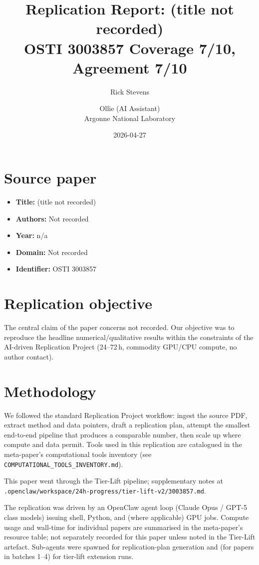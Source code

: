 \documentclass[11pt]{article}
\title{Replication Report: (title not recorded)\\[2pt]\large OSTI 3003857 \textbar{} Coverage 7/10, Agreement 7/10}
\author{Rick Stevens \and Ollie (AI Assistant)\\\small Argonne National Laboratory}
\date{2026-04-27}
\begin{document}
\maketitle

\section{Source paper}
\begin{itemize}
\item \textbf{Title:} (title not recorded)
\item \textbf{Authors:} Not recorded
\item \textbf{Year:} n/a
\item \textbf{Domain:} Not recorded
\item \textbf{Identifier:} OSTI 3003857
\end{itemize}


\section{Replication objective}
The central claim of the paper concerns not recorded. Our objective was to reproduce the headline numerical/qualitative results within the constraints of the AI-driven Replication Project (24--72\,h, commodity GPU/CPU compute, no author contact). 

\section{Methodology}
We followed the standard Replication Project workflow: ingest the source PDF, extract method and data pointers, draft a replication plan, attempt the smallest end-to-end pipeline that produces a comparable number, then scale up where compute and data permit. Tools used in this replication are catalogued in the meta-paper's computational tools inventory (see \texttt{COMPUTATIONAL\_TOOLS\_INVENTORY.md}).

This paper went through the Tier-Lift pipeline; supplementary notes at \texttt{.openclaw/workspace/24h-progress/tier-lift-v2/3003857.md}.



The replication was driven by an OpenClaw agent loop (Claude Opus / GPT-5 class models) issuing shell, Python, and (where applicable) GPU jobs. Compute usage and wall-time for individual papers are summarised in the meta-paper's resource table; not separately recorded for this paper unless noted in the Tier-Lift artefact. Sub-agents were spawned for replication-plan generation and (for papers in batches 1--4) for tier-lift extension runs.
\end{document}
